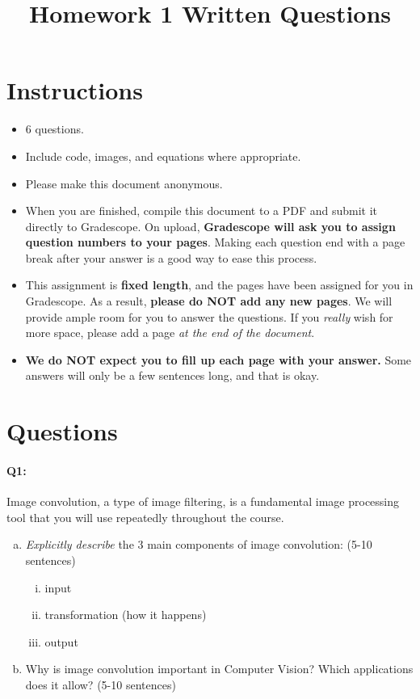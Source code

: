 \date{}

\title{\vspace{-1cm}Homework 1 Written Questions}



\maketitle
\vspace{-3cm}
\thispagestyle{fancy}

\section*{Instructions}
\begin{itemize}
  \item 6 questions.
  \item Include code, images, and equations where appropriate.
  \item Please make this document anonymous.
  \item When you are finished, compile this document to a PDF and submit it directly to Gradescope. On upload, \textbf{Gradescope will ask you to assign question numbers to your pages}. Making each question end with a page break after your answer is a good way to ease this process.
  \item This assignment is \textbf{fixed length}, and the pages have been assigned for you in Gradescope. As a result, \textbf{please do NOT add any new pages}. We will provide ample room for you to answer the questions. If you \emph{really} wish for more space, please add a page \emph{at the end of the document}.
  \item \textbf{We do NOT expect you to fill up each page with your answer.} Some answers will only be a few sentences long, and that is okay.
\end{itemize}

\section*{Questions}

\paragraph{Q1:} Image convolution, a type of image filtering, is a fundamental image processing tool that you will use repeatedly throughout the course.

\begin{enumerate}[(a)]
\item \emph{Explicitly describe} the 3 main components of image convolution: (5-10 sentences)
\begin{enumerate}[(i)]
    \item input
    \item transformation (how it happens)
    \item output
\end{enumerate}
\item Why is image convolution important in Computer Vision? Which applications does it allow? (5-10 sentences)
\end{enumerate}


